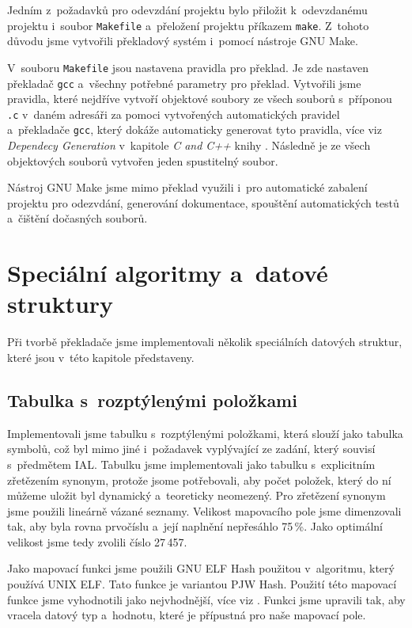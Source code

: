 \documentclass[a4paper, 11pt]{article}
\begin{document}
	Jedním z~požadavků pro odevzdání projektu bylo přiložit k~odevzdanému projektu i~soubor \texttt{Makefile} a~přeložení
	projektu příkazem \texttt{make}. Z~tohoto důvodu jsme vytvořili překladový systém i~pomocí nástroje GNU Make.

	V~souboru \texttt{Makefile} jsou nastavena pravidla pro překlad. Je zde nastaven překladač \texttt{gcc}
	a~všechny potřebné parametry pro překlad. Vytvořili jsme pravidla, které nejdříve vytvoří objektové soubory
	ze všech souborů s~příponou \texttt{.c} v~daném adresáři za pomoci vytvořených automatických pravidel a~překladače \texttt{gcc},
	který dokáže automaticky generovat tyto pravidla, více viz \emph{Dependecy Generation} v~kapitole \emph{C and C++}
	knihy \cite{Mecklenburgc2005}. Následně je ze všech objektových souborů vytvořen jeden spustitelný
	soubor.

	Nástroj GNU Make jsme mimo překlad využili i~pro automatické zabalení projektu pro odezvdání, generování dokumentace,
	spouštění automatických testů a~čištění dočasných souborů.


	\section{Speciální algoritmy a~datové struktury}

	Při tvorbě překladače jsme implementovali několik speciálních datových struktur,
	které jsou v~této kapitole představeny.


	\subsection{Tabulka s~rozptýlenými položkami}

	Implementovali jsme tabulku s~rozptýlenými položkami, která slouží jako tabulka symbolů, což byl mimo
	jiné i~požadavek vyplývající ze zadání, který souvisí s~předmětem IAL. Tabulku jsme implementovali
	jako tabulku s~explicitním zřetězením synonym, protože jsome potřebovali, aby počet položek,
	který do ní můžeme uložit byl dynamický a~teoreticky neomezený. Pro zřetězení synonym jsme použili
	lineárně vázané seznamy. Velikost mapovacího pole jsme dimenzovali tak, aby byla rovna prvočíslu a~její
	naplnění nepřesáhlo 75\,\%. Jako optimální velikost jsme tedy zvolili číslo 27\,457.

	Jako mapovací funkci jsme použili GNU ELF Hash použitou v~algoritmu, který používá UNIX ELF.
	Tato funkce je variantou PJW Hash. Použití této mapovací funkce jsme vyhodnotili jako nejvhodnější,
	více viz \cite{PJWHashFunction2017}. Funkci jsme upravili tak, aby vracela datový typ a~hodnotu,
	které je přípustná pro naše mapovací pole.
\end{document}
